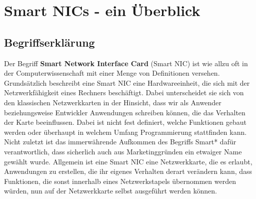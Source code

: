 %
%

\chapter{Smart NICs - ein Überblick}
\label{cha:background}

\section{Begriffserklärung}
Der Begriff \textbf{Smart Network Interface Card} (Smart NIC) ist wie allzu oft in der Computerwissenschaft mit einer Menge von Definitionen versehen. Grundsätzlich beschreibt eine Smart NIC eine Hardwareeinheit, die sich mit der Netzwerkfähigkeit eines Rechners beschäftigt. Dabei unterscheidet sie sich von den klassischen Netzwerkkarten in der Hinsicht, dass wir als Anwender beziehungsweise Entwickler Anwendungen schreiben können, die das Verhalten der Karte beeinflussen. Dabei ist nicht fest definiert, welche Funktionen gebaut werden oder überhaupt in welchem Umfang Programmierung stattfinden kann. Nicht zuletzt ist das immerwährende Aufkommen des Begriffs Smart* dafür verantwortlich, dass sicherlich auch aus Marketinggründen ein etwaiger Name gewählt wurde. Allgemein ist eine Smart NIC eine Netzwerkkarte, die es erlaubt, Anwendungen zu erstellen, die ihr eigenes Verhalten derart verändern kann, dass Funktionen, die sonst innerhalb eines Netzwerkstapels übernommen werden würden, nun auf der Netzwerkkarte selbst ausgeführt werden können. \cite{smartnicsComproSurvey}

